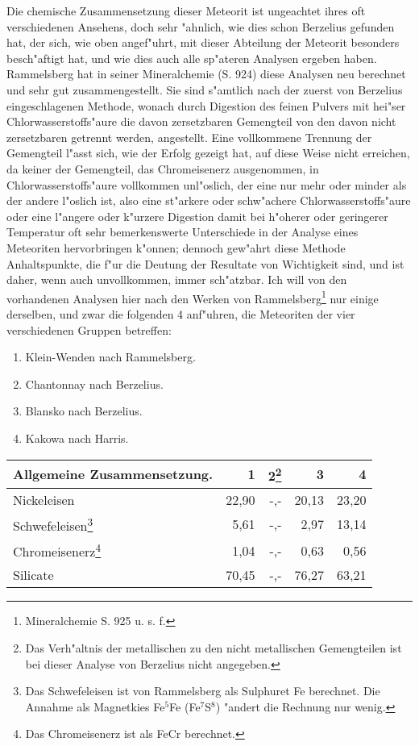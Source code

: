 \documentclass[a4paper, 11pt, oneside, german]{article}
\begin{document}
Die chemische Zusammensetzung dieser Meteorit ist ungeachtet ihres oft verschiedenen Ansehens, doch sehr "ahnlich, wie dies schon Berzelius gefunden hat, der sich, wie oben angef"uhrt, mit dieser Abteilung der Meteorit besonders besch"aftigt hat, und wie dies auch alle sp"ateren Analysen ergeben haben. Rammelsberg hat in seiner Mineralchemie (S. 924) diese Analysen neu berechnet und sehr gut zusammengestellt. Sie sind s"amtlich nach der zuerst von Berzelius eingeschlagenen Methode, wonach durch Digestion des feinen Pulvers mit hei"ser Chlorwasserstoffs"aure die davon zersetzbaren Gemengteil von den davon nicht zersetzbaren getrennt werden, angestellt. Eine vollkommene Trennung der Gemengteil l"asst sich, wie der Erfolg gezeigt hat, auf diese Weise nicht erreichen, da keiner der Gemengteil, das Chromeisenerz ausgenommen, in Chlorwasserstoffs"aure vollkommen unl"oslich, der eine nur mehr oder minder als der andere l"oslich ist, also eine st"arkere oder schw"achere Chlorwasserstoffs"aure oder eine l"angere oder k"urzere Digestion damit bei h"oherer oder geringerer Temperatur oft sehr bemerkenswerte Unterschiede in der Analyse eines Meteoriten hervorbringen k"onnen; dennoch gew"ahrt diese Methode Anhaltspunkte, die f"ur die Deutung der Resultate von Wichtigkeit sind, und ist daher, wenn auch unvollkommen, immer sch"atzbar. Ich will von den vorhandenen Analysen hier nach den Werken von Rammelsberg\footnote{Mineralchemie S. 925 u. s. f.} nur einige derselben, und zwar die folgenden 4 anf"uhren, die Meteoriten der vier verschiedenen Gruppen betreffen:
\begin{enumerate}
    \item Klein-Wenden nach Rammelsberg.
    \item Chantonnay nach Berzelius.
    \item Blansko nach Berzelius.
    \item Kakowa nach Harris.
\end{enumerate}
\clearpage
\begin{center}
\begin{tabular}{ |l|r|r|r|r| }
    \hline
    Allgemeine Zusammensetzung. & 1 & 2\footnote{Das Verh"altnis der metallischen zu den nicht metallischen Gemengteilen ist bei dieser Analyse von Berzelius nicht angegeben.} & 3 & 4\\
    \hline\hline
    Nickeleisen & 22,90 & -,- & 20,13 & 23,20\\\hline
    Schwefeleisen\footnote{Das Schwefeleisen ist von Rammelsberg als Sulphuret Fe berechnet. Die Annahme als Magnetkies Fe$^{5}$Fe (Fe$^{7}$S$^{8}$) "andert die Rechnung nur wenig.} & 5,61 & -,- & 2,97 & 13,14\\\hline
    Chromeisenerz\footnote{Das Chromeisenerz ist als FeCr berechnet.} & 1,04 & -,- & 0,63 & 0,56\\\hline
    Silicate & 70,45 & -,- & 76,27 & 63,21\\
    \hline
\end{tabular}
\end{center}
\end{document}
